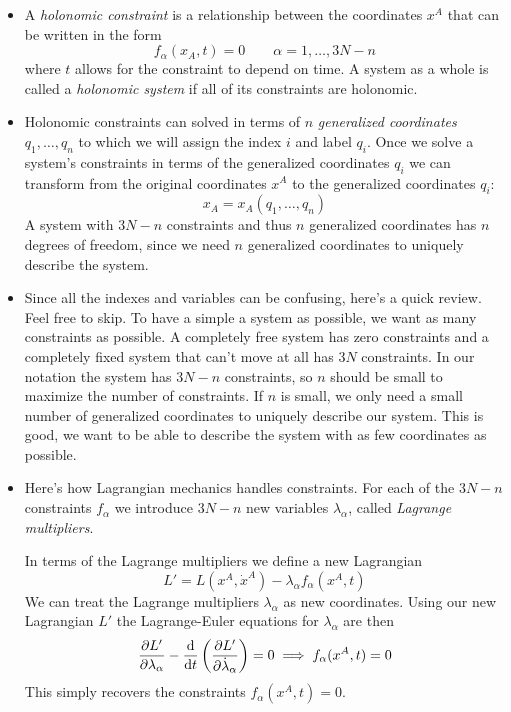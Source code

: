 \documentclass[11pt, a4paper]{article}
\begin{document}
\begin{itemize}
	\item A \textit{holonomic constraint} is a relationship between the coordinates $ x^{A} $ that can be written in the form
	\begin{equation*}
		f_{\alpha}(x_{A}, t ) = 0 \qquad \alpha = 1, \ldots, 3N - n
	\end{equation*}
	where $ t $ allows for the constraint to depend on time. A system as a whole is called a \textit{holonomic system} if all of its constraints are holonomic.

	
	\item Holonomic constraints can solved in terms of $ n $ \textit{generalized coordinates} $ q_{1}, \ldots, q_{n} $ to which we will assign the index $ i $ and label $ q_{i} $. Once we solve a system's constraints in terms of the generalized coordinates $ q_{i} $ we can transform from the original coordinates $ x^{A} $ to the generalized coordinates $ q_{i} $:
	\begin{equation*}
		x_{A} = x_{A} (q_{1}, \ldots, q_{n})
	\end{equation*}
	A system with $ 3N - n $ constraints and thus $ n $ generalized coordinates has $ n $ degrees of freedom, since we need $ n $ generalized coordinates to uniquely describe the system.
	
	\item Since all the indexes and variables can be confusing, here's a quick review. Feel free to skip. To have a simple a system as possible, we want as many constraints as possible. A completely free system has zero constraints and a completely fixed system that can't move at all has $ 3N $ constraints. In our notation the system has $ 3N - n $ constraints, so $ n $ should be small to maximize the number of constraints. If $ n $ is small, we only need a small number of generalized coordinates to uniquely describe our system. This is good, we want to be able to describe the system with as few coordinates as possible.
	
	\item Here's how Lagrangian mechanics handles constraints. For each of the $ 3N -n  $ constraints $ f_{\alpha} $ we introduce $ 3N - n $ new variables $ \lambda_{\alpha} $, called \textit{Lagrange multipliers}.
	
	In terms of the Lagrange multipliers we define a new Lagrangian
	\begin{equation*}
		L' = L(x^{A}, \dot{x}^{A}) - \lambda_{\alpha}f_{\alpha}(x^{A}, t)
	\end{equation*}
	We can treat the Lagrange multipliers $ \lambda_{\alpha} $ as new coordinates. Using our new Lagrangian $ L' $ the Lagrange-Euler equations for $ \lambda_{\alpha} $ are then
	\begin{equation*}
		\pdv{L'}{\lambda_{\alpha}} - \dv{}{t}\left(\pdv{L'}{\dot{\lambda}_{\alpha}} \right) = 0 \implies f_{\alpha}(x^{A}, t) = 0 
	\end{equation*}
	This simply recovers the constraints $ f_{\alpha}(x^{A}, t) = 0  $. 
	

\end{itemize}
\end{document}
